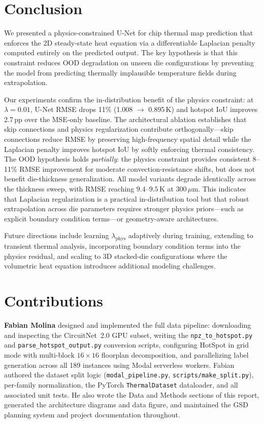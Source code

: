 \documentclass[10pt,twocolumn,letterpaper]{article}
\begin{document}
\section{Conclusion}

We presented a physics-constrained U-Net for chip thermal map
prediction that enforces the 2D steady-state heat equation via a
differentiable Laplacian penalty computed entirely on the predicted
output. The key hypothesis is that this constraint reduces OOD
degradation on unseen die configurations by preventing the model
from predicting thermally implausible temperature fields during
extrapolation.

Our experiments confirm the in-distribution benefit of the physics
constraint: at $\lambda{=}0.01$, U-Net RMSE drops 11\% (1.008
$\to$ 0.895\,K) and hotspot IoU improves 2.7\,pp over the MSE-only
baseline. The architectural ablation establishes that skip connections
and physics regularization contribute orthogonally---skip connections
reduce RMSE by preserving high-frequency spatial detail while the
Laplacian penalty improves hotspot IoU by softly enforcing thermal
consistency. The OOD hypothesis holds \emph{partially}: the physics
constraint provides consistent 8--11\% RMSE improvement for moderate
convection-resistance shifts, but does not benefit die-thickness
generalization. All model variants degrade identically across the
thickness sweep, with RMSE reaching $9.4$--$9.5$\,K at 300\,$\mu$m.
This indicates that Laplacian regularization is a practical in-distribution
tool but that robust extrapolation across die parameters requires
stronger physics priors---such as explicit boundary condition terms---or
geometry-aware architectures.

Future directions include learning $\lambda_\text{phys}$ adaptively
during training, extending to transient thermal analysis, incorporating
boundary condition terms into the physics residual, and scaling to
3D stacked-die configurations where the volumetric heat equation
introduces additional modeling challenges.


\section*{Contributions}

\textbf{Fabian Molina} designed and implemented the full data pipeline:
downloading and inspecting the CircuitNet~2.0 GPU subset, writing the
\texttt{npz\_to\_hotspot.py} and \texttt{parse\_hotspot\_output.py}
conversion scripts, configuring HotSpot in grid mode with multi-block
$16{\times}16$ floorplan decomposition, and parallelizing label
generation across all 189 instances using Modal serverless workers.
Fabian authored the dataset split logic (\texttt{modal\_pipeline.py},
\texttt{scripts/make\_split.py}), per-family normalization, the
PyTorch \texttt{ThermalDataset} dataloader, and all associated unit
tests. He also wrote the Data and Methods sections of this report,
generated the architecture diagrams and data figure, and maintained
the GSD planning system and project documentation throughout.
\end{document}
